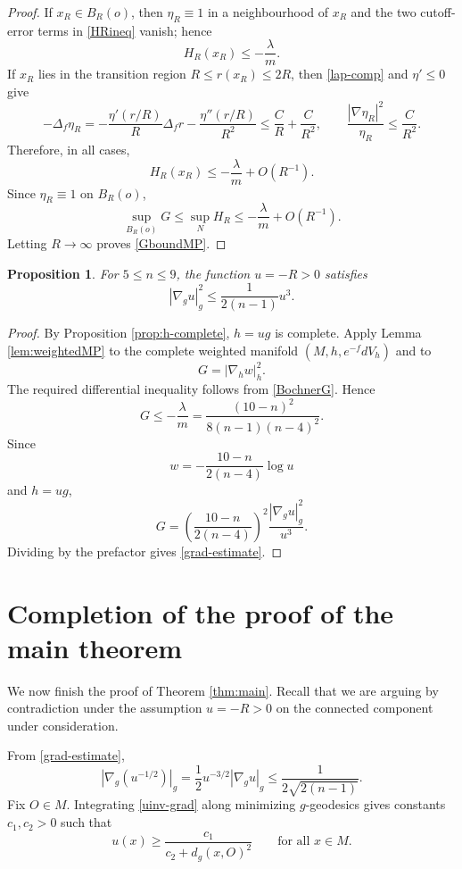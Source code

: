 \documentclass[11pt]{amsart}
\numberwithin{equation}{section}
\newtheorem{proposition}[theorem]{Proposition}
\newcommand{\norm}[1]{\left|#1\right|}
\begin{document}
\begin{proof}
If $x_R\in B_R(o)$, then $\eta_R\equiv1$ in a neighbourhood of $x_R$ and the two cutoff-error terms in \eqref{HRineq} vanish; hence
$$
        H_R(x_R)\leq -\frac{\lambda}{m}.
$$
If $x_R$ lies in the transition region $R\leq r(x_R)\leq2R$, then \eqref{lap-comp} and $\eta'\leq0$ give
$$
        -\Delta_f\eta_R
        =-\frac{\eta'(r/R)}{R}\Delta_f r-\frac{\eta''(r/R)}{R^2}
        \leq \frac{C}{R}+\frac{C}{R^2},
        \qquad
        \frac{\norm{\nabla\eta_R}^2}{\eta_R}
        \leq \frac{C}{R^2} .
$$
Therefore, in all cases,
$$
        H_R(x_R)\leq -\frac{\lambda}{m}+O(R^{-1}).
$$
Since $\eta_R\equiv1$ on $B_R(o)$,
$$
        \sup_{B_R(o)}G\leq \sup_N H_R\leq -\frac{\lambda}{m}+O(R^{-1}).
$$
Letting $R\to\infty$ proves \eqref{GboundMP}.
\end{proof}

\begin{proposition}\label{prop:grad}
For $5\leq n\leq 9$, the function $u=-R>0$ satisfies
\begin{equation}\label{grad-estimate}
        \norm{\nabla_g u}_g^2
        \leq
        \frac{1}{2(n-1)}u^3 .
\end{equation}
\end{proposition}

\begin{proof}
By Proposition \ref{prop:h-complete}, $h=ug$ is complete.  Apply Lemma \ref{lem:weightedMP} to the complete weighted manifold $(M,h,e^{-f}dV_h)$ and to
$$
        G=\norm{\nabla_h w}_h^2 .
$$
The required differential inequality follows from \eqref{BochnerG}.  Hence
$$
        G\leq -\frac{\lambda}{m}
        =\frac{(10-n)^2}{8(n-1)(n-4)^2} .
$$
Since
$$
        w=-\frac{10-n}{2(n-4)}\log u
$$
and $h=ug$,
$$
        G
        =\left(\frac{10-n}{2(n-4)}\right)^2
          \frac{\norm{\nabla_g u}_g^2}{u^3} .
$$
Dividing by the prefactor gives \eqref{grad-estimate}.
\end{proof}

\section{Completion of the proof of the main theorem}\label{sec:proofmain}

We now finish the proof of Theorem \ref{thm:main}.  Recall that we are arguing by contradiction under the assumption $u=-R>0$ on the connected component under consideration.

From \eqref{grad-estimate},
\begin{equation}\label{uinv-grad}
        \norm{\nabla_g(u^{-1/2})}_g
        =\frac12 u^{-3/2}\norm{\nabla_g u}_g
        \leq \frac{1}{2\sqrt{2(n-1)}} .
\end{equation}
Fix $O\in M$.  Integrating \eqref{uinv-grad} along minimizing $g$-geodesics gives constants $c_1,c_2>0$ such that
\begin{equation}\label{u-lower}
        u(x)\geq \frac{c_1}{c_2+d_g(x,O)^2}
        \qquad\text{for all }x\in M .
\end{equation}
\end{document}

